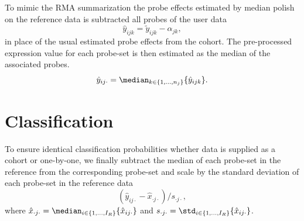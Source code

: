 To mimic the RMA summarization the probe effects estimated by median polish on the reference data is subtracted all probes of the user data
\begin{equation*}
   \hat{y}_{ijk} = \tilde{y}_{ijk} - \hat{\alpha}_{jk},
\end{equation*}
in place of the usual estimated probe effects from the cohort.
The pre-processed expression value for each probe-set is then estimated as the median of the associated probes.
\begin{equation*}
   \hat{y}_{ij\cdot} = \median_{k \in \{1,\dots,n_j \}} \{ \hat{y}_{ijk} \}.
\end{equation*}


\section{Classification}
To ensure identical classification probabilities whether data is supplied as a cohort or one-by-one, we finally subtract the median of each probe-set in the reference from the corresponding probe-set and scale by the standard deviation of each probe-set in the reference data
\begin{equation*}
  (\hat{y}_{ij\cdot} - \hat{x}_{\cdot j\cdot})/s_{\cdot j\cdot},
\end{equation*}
where
$\hat{x}_{\cdot j\cdot} = \median_{i \in \{1,\dots,I_R \}} \{\hat{x}_{ij\cdot}\}$ and $s_{\cdot j\cdot} = \std_{i \in \{1,\dots,I_R\}} \{\hat{x}_{ij\cdot}\}$.


% 
